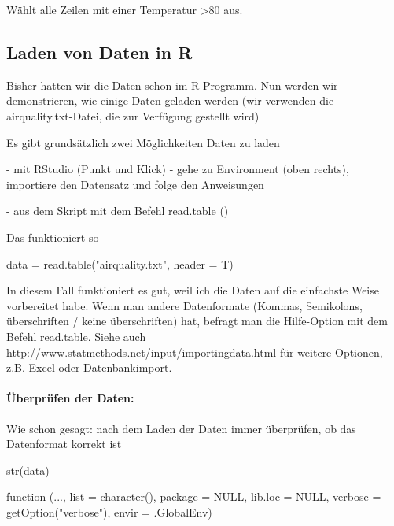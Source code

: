 \documentclass[a4paper,twoside]{tufte-book}\usepackage[]{graphicx}\usepackage[]{color}
\begin{document}
\begin{appendices}
\begin{Schunk}
\end{Schunk}

Wählt alle Zeilen mit einer Temperatur >80 aus.


\subsection{Laden von Daten in R}

Bisher hatten wir die Daten schon im R Programm. Nun werden wir demonstrieren, wie einige Daten geladen werden (wir verwenden die airquality.txt-Datei, die zur Verfügung gestellt wird)

Es gibt grundsätzlich zwei Möglichkeiten Daten zu laden

- mit RStudio (Punkt und Klick) - gehe zu Environment (oben rechts), importiere den Datensatz und folge den Anweisungen

- aus dem Skript mit dem Befehl read.table ()

Das funktioniert so

\begin{Schunk}
\begin{Sinput}
data = read.table("airquality.txt", header = T)
\end{Sinput}
\end{Schunk}

In diesem Fall funktioniert es gut, weil ich die Daten auf die einfachste Weise vorbereitet habe. Wenn man andere Datenformate (Kommas, Semikolons, überschriften / keine überschriften) hat, befragt man die Hilfe-Option mit dem Befehl read.table. Siehe auch http://www.statmethods.net/input/importingdata.html für weitere Optionen, z.B. Excel oder Datenbankimport.

\paragraph{Überprüfen der Daten:} Wie schon gesagt: nach dem Laden der Daten immer überprüfen, ob das Datenformat korrekt ist

\begin{Schunk}
\begin{Sinput}
str(data)
\end{Sinput}
\begin{Soutput}
function (..., list = character(), package = NULL, lib.loc = NULL, 
    verbose = getOption("verbose"), envir = .GlobalEnv)  
\end{Soutput}
\end{Schunk}


\end{appendices}
\end{document}
